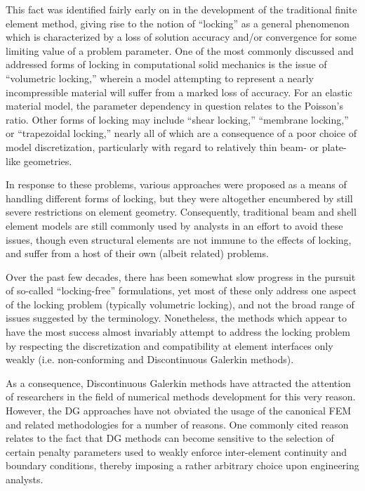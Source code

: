 This fact was identified fairly early on in the development of the traditional finite element method, giving rise to the notion of ``locking'' as a general phenomenon which is characterized by a loss of solution accuracy and/or convergence for some limiting value of a problem parameter. One of the most commonly discussed and addressed forms of locking in computational solid mechanics is the issue of ``volumetric locking,'' wherein a model attempting to represent a nearly incompressible material will suffer from a marked loss of accuracy. For an elastic material model, the parameter dependency in question relates to the Poisson's ratio. Other forms of locking may include ``shear locking,'' ``membrane locking,'' or ``trapezoidal locking,'' nearly all of which are a consequence of a poor choice of model discretization, particularly with regard to relatively thin beam- or plate-like geometries.

In response to these problems, various approaches were proposed as a means of handling different forms of locking, but they were altogether encumbered by still severe restrictions on element geometry. Consequently, traditional beam and shell element models are still commonly used by analysts in an effort to avoid these issues, though even structural elements are not immune to the effects of locking, and suffer from a host of their own (albeit related) problems.

Over the past few decades, there has been somewhat slow progress in the pursuit of so-called ``locking-free'' formulations, yet most of these only address one aspect of the locking problem (typically volumetric locking), and not the broad range of issues suggested by the terminology. Nonetheless, the methods which appear to have the most success almost invariably attempt to address the locking problem by respecting the discretization and compatibility at element interfaces only weakly (i.e. non-conforming and Discontinuous Galerkin methods).

As a consequence, Discontinuous Galerkin methods have attracted the attention of researchers in the field of numerical methods development for this very reason. However, the DG approaches have not obviated the usage of the canonical FEM and related methodologies for a number of reasons. One commonly cited reason relates to the fact that DG methods can become sensitive to the selection of certain penalty parameters used to weakly enforce inter-element continuity and boundary conditions, thereby imposing a rather arbitrary choice upon engineering analysts.

